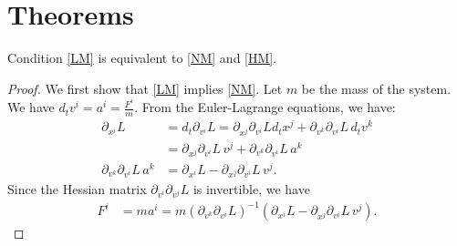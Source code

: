 \documentclass{techbrief}
\begin{document}
	\section{Theorems}
	\begin{thrm}
		Condition \ref{LM} is equivalent to \ref{NM} and \ref{HM}.
	\end{thrm}
	\begin{proof}
		We first show that \ref{LM} implies \ref{NM}. Let $m$ be the mass of the system. We have $d_{t}v^{i}=a^{i}=\frac{F^i}{m}$. From the Euler-Lagrange equations, we have:
		\begin{equation}
			\begin{aligned}
				\partial_{x^i}L&= d_t \partial_{v^i} L = \partial_{x^j} \partial_{v^i} L d_t x^j + \partial_{v^k} \partial_{v^i} L \, d_t v^k \\ &= \partial_{x^j} \partial_{v^i} L \, v^j + \partial_{v^k} \partial_{v^i} L \, a^k \\
				\partial_{v^k} \partial_{v^i} L \, a^k &= \partial_{x^i}L - \partial_{x^j} \partial_{v^i} L \, v^j .
			\end{aligned}
		\end{equation} 
		Since the Hessian matrix $\partial_{v^{i}}\partial_{v^{j}}L$ is invertible, we have
		\begin{equation}
			\begin{aligned}
				F^i &= m a^i = m (\partial_{v^k} \partial_{v^i} L)^{-1}(\partial_{x^i}L - \partial_{x^j} \partial_{v^i} L \, v^j).
			\end{aligned}
		\end{equation} 
		

\end{proof}
\end{document}
